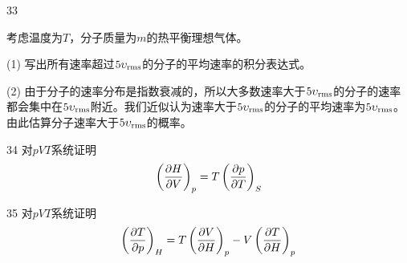 \documentclass[CJK]{beamer}
\begin{document}
\begin{frame}
  \bch
  {\small
  \bitem
\item[33]{ 考虑温度为$T$，分子质量为$m$的热平衡理想气体。
    \bitem
	\item[(1)] {写出所有速率超过$5\upsilon_{\rm rms}$的分子的平均速率的积分表达式。}
	\item[(2)] {由于分子的速率分布是指数衰减的，所以大多数速率大于$5\upsilon_{\rm rms}$的分子的速率都会集中在$5\upsilon_{\rm rms}$附近。我们近似认为速率大于$5\upsilon_{\rm rms}$的分子的平均速率为$5\upsilon_{\rm rms}$。由此估算分子速率大于$5\upsilon_{\rm rms}$的概率。}
          \eitem
}
\item[34]{对$pVT$系统证明  $$\left(\frac{\partial H}{\partial V}\right)_{p} = T\left(\frac{\partial p}{\partial T}\right)_{S} $$}
\item[35]{对$pVT$系统证明$$\left(\frac{\partial T}{\partial p}\right)_{H} = T \left(\frac{\partial V}{\partial H}\right)_{p} - V\left(\frac{\partial T}{\partial H}\right)_{p}$$}
  \eitem
}
  
  \ech
\end{frame}
\end{document}
